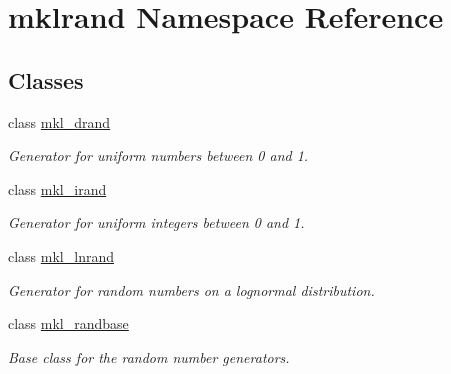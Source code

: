 \hypertarget{namespacemklrand}{}\section{mklrand Namespace Reference}
\label{namespacemklrand}
\subsection*{Classes}
\begin{DoxyCompactItemize}
\item 
class \hyperlink{classmklrand_1_1mkl__drand}{mkl\+\_\+drand}
\begin{DoxyCompactList}\small\item\em Generator for uniform numbers between 0 and 1. \end{DoxyCompactList}\item 
class \hyperlink{classmklrand_1_1mkl__irand}{mkl\+\_\+irand}
\begin{DoxyCompactList}\small\item\em Generator for uniform integers between 0 and 1. \end{DoxyCompactList}\item 
class \hyperlink{classmklrand_1_1mkl__lnrand}{mkl\+\_\+lnrand}
\begin{DoxyCompactList}\small\item\em Generator for random numbers on a lognormal distribution. \end{DoxyCompactList}\item 
class \hyperlink{classmklrand_1_1mkl__randbase}{mkl\+\_\+randbase}
\begin{DoxyCompactList}\small\item\em Base class for the random number generators. \end{DoxyCompactList}\end{DoxyCompactItemize}
